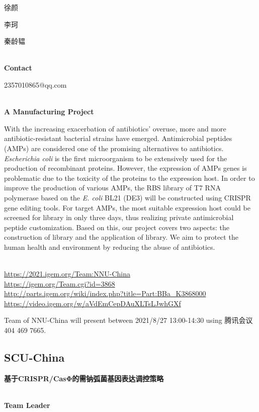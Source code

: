   徐颜

  李珂

  秦龄韫


\textbf{\\Contact}

  2357010865@qq.com


\textbf{\\A Manufacturing Project\\}\begin{spacing}{1.5}

With the increasing exacerbation of antibiotics’ overuse, more and more antibiotic-resistant bacterial strains have emerged. Antimicrobial peptides (AMPs) are considered one of the promising alternatives to antibiotics. \textit{Escherichia coli} is the first microorganism to be extensively used for the production of recombinant proteins. However, the expression of AMPs genes is problematic due to the toxicity of the proteins to the expression host. In order to improve the production of various AMPs, the RBS library of T7 RNA polymerase based on the \textit{E. coli} BL21 (DE3) will be constructed using CRISPR gene editing tools. For target AMPs, the most suitable expression host could be screened for library in only three days, thus realizing private antimicrobial peptide customization. Based on this, our project covers two aspects: the construction of library and the application of library. We aim to protect the human health and environment by reducing the abuse of antibiotics.\end{spacing}
\\

\url{https://2021.igem.org/Team:NNU-China }\\
\url{https://igem.org/Team.cgi?id=3868 }\\
\url{http://parts.igem.org/wiki/index.php?title=Part:BBa_K3868000 }\\
\url{https://video.igem.org/w/aVdEmCepDAuXLTsLJwhGXf }\\

\vfill{}









Team of NNU-China will present between 2021/8/27 13:00-14:30        using 腾讯会议 404 469 7665.
\newpage


\subsection{\textcolor{Blu}{ SCU-China } }
\vspace{5mm}
\begin{center}
\large{
  \textbf{ 基于CRISPR/CasΦ的需钠弧菌基因表达调控策略 }\\

}
\end{center}
\textbf{\\Team Leader}


